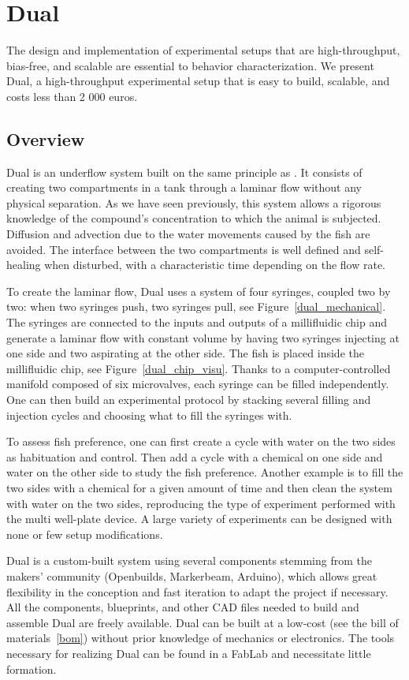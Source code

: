  \section{Dual}
  The design and implementation of experimental setups that are high-throughput, bias-free, and scalable are essential to behavior characterization. We present Dual, a high-throughput experimental setup that is easy to build, scalable, and costs less than 2 000 euros.

  \subsection{Overview}
  Dual is an underflow system built on the same principle as \cite{readman2013fish}. It consists of creating two compartments in a tank through a laminar flow without any physical separation. As we have seen previously, this system allows a rigorous knowledge of the compound's concentration to which the animal is subjected. Diffusion and advection due to the water movements caused by the fish are avoided. The interface between the two compartments is well defined and self-healing when disturbed, with a characteristic time depending on the flow rate.

  To create the laminar flow, Dual uses a system of four syringes, coupled two by two: when two syringes push, two syringes pull, see Figure~\ref{dual_mechanical}. The syringes are connected to the inputs and outputs of a millifluidic chip and generate a laminar flow with constant volume by having two syringes injecting at one side and two aspirating at the other side. The fish is placed inside the millifluidic chip, see Figure~\ref{dual_chip_visu}. Thanks to a computer-controlled manifold composed of six microvalves, each syringe can be filled independently. One can then build an experimental protocol by stacking several filling and injection cycles and choosing what to fill the syringes with.

  To assess fish preference, one can first create a cycle with water on the two sides as habituation and control. Then add a cycle with a chemical on one side and water on the other side to study the fish preference. Another example is to fill the two sides with a chemical for a given amount of time and then clean the system with water on the two sides, reproducing the type of experiment performed with the multi well-plate device. A large variety of experiments can be designed with none or few setup modifications.

  Dual is a custom-built system using several components stemming from the makers' community (Openbuilds, Markerbeam, Arduino), which allows great flexibility in the conception and fast iteration to adapt the project if necessary. All the components, blueprints, and other CAD files needed to build and assemble Dual are freely available. Dual can be built at a low-cost (see the bill of materials~\ref{bom}) without prior knowledge of mechanics or electronics. The tools necessary for realizing Dual can be found in a FabLab and necessitate little formation.

